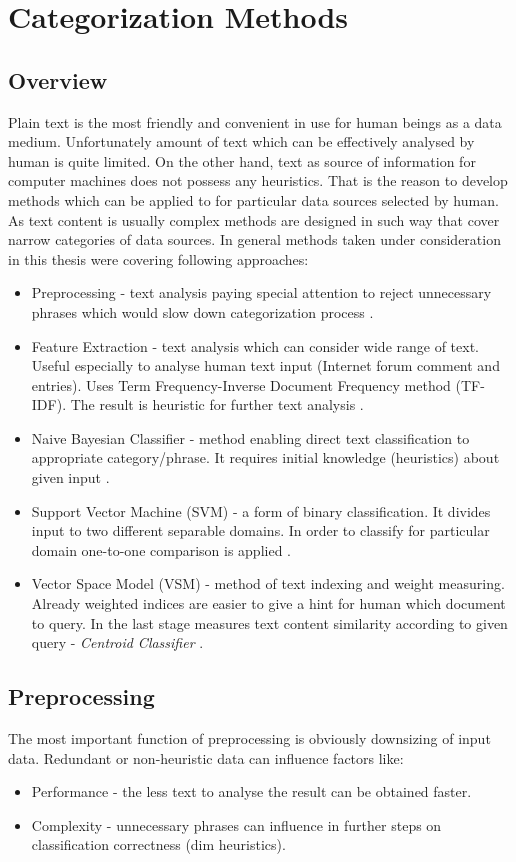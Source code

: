 \chapter{Categorization Methods}
\section{Overview}
Plain text is the most friendly and convenient in use for human beings as a data medium. Unfortunately amount of text which can be effectively analysed by human is quite limited. On the other hand, text as source of information for computer machines does not possess any heuristics. That is the reason to develop methods which can be applied to for particular data sources selected by human. As text content is usually complex methods are designed in such way that cover narrow categories of data sources. In general methods taken under consideration in this thesis were covering following approaches:
\begin{itemize}
	\item Preprocessing - text analysis paying special attention to reject unnecessary phrases which would slow down categorization process \cite{1}. 
	\item Feature Extraction - text analysis which can consider wide range of text. Useful especially to analyse human text input (Internet forum comment and entries). Uses Term Frequency-Inverse Document Frequency method (TF-IDF). The result is heuristic for further text analysis \cite{3}.
	\item Naive Bayesian Classifier - method enabling direct text classification to appropriate  category/phrase. It requires initial knowledge (heuristics) about given input \cite{5}.
	\item Support Vector Machine (SVM) - a form of binary classification. It divides input to two different separable domains. In order to classify for particular domain one-to-one comparison is applied \cite{7}\cite{svm_wiki}.
	\item Vector Space Model (VSM) - method of text indexing and weight measuring. Already weighted indices are easier to give a hint for human which document to query. In the last stage measures text content similarity according to given query - \textit{Centroid Classifier} \cite{33}.
	       
\end{itemize}

\section{Preprocessing}
The most important function of preprocessing is obviously downsizing of input data. Redundant or non-heuristic data can influence factors like:
\begin{itemize}
	\item Performance - the less text to analyse the result can be obtained faster.
	\item Complexity - unnecessary phrases can influence in further steps on classification correctness (dim heuristics).
\end{itemize}


